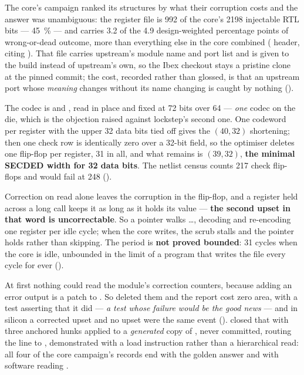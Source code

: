 The core's campaign ranked its structures by what their corruption costs
and the answer was unambiguous: the register file is 992 of the core's
\num{2198} injectable RTL bits --- \SI{45}{\percent} --- and carries 3.2
of the 4.9 design-weighted percentage points of wrong-or-dead outcome,
more than everything else in the core combined
( header, citing ).
That file carries upstream's module name and port list and is given to
the build instead of upstream's own, so the Ibex checkout stays a
pristine clone at the pinned commit; the cost, recorded rather than
glossed, is that an upstream port whose \emph{meaning} changes without
its name changing is caught by nothing ().

The codec is  and , read
in place and fixed at 72 bits over 64 --- \emph{one} codec on the die,
which is the objection  raised against lockstep's second one.
One codeword per register with the upper 32 data bits tied off gives the
$(40,32)$ shortening; then one check row is identically zero over a
32-bit field, so the optimiser deletes one flip-flop per register, 31 in
all, and what remains is $(39,32)$, \textbf{the minimal SECDED width for
32 data bits}. The netlist census counts 217 check flip-flops and
would fail at 248 ().

Correction on read alone leaves the corruption in the flip-flop, and a
register held across a long call keeps it as long as it holds its value
--- \textbf{the second upset in that word is uncorrectable}. So a
pointer walks \dots{}, decoding and re-encoding one
register per idle cycle; when the core writes, the scrub stalls and the
pointer holds rather than skipping. The period is \textbf{not proved
bounded}: 31 cycles when the core is idle, unbounded in the limit of a
program that writes the file every cycle for ever
().

At first nothing could read the module's correction counters, because
adding an error output is a patch to . So
 deleted them and the report cost zero area, with a
test asserting that it did --- \emph{a test whose failure would be the
good news} --- and in silicon a corrected upset and no upset were the
same event ().  closed that with three
anchored hunks applied to a \emph{generated} copy of
, never committed, routing the line to
, demonstrated with a load instruction rather than
a hierarchical read: all four of the core campaign's 
records end with the golden answer and with software reading
.

